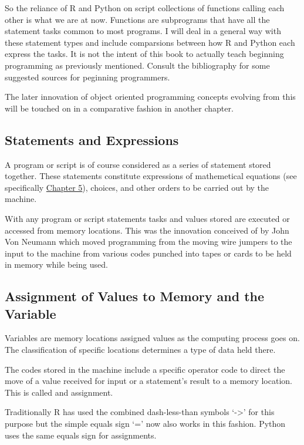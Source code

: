 \documentclass[]{book}
\theoremstyle{definition}
\theoremstyle{definition}
\theoremstyle{definition}
\theoremstyle{remark}
\begin{document}
So the reliance of R and Python on script collections of functions
calling each other is what we are at now. Functions are subprograms that
have all the statement tasks common to most programs. I will deal in a
general way with these statement types and include comparsions between
how R and Python each express the tasks. It is not the intent of this
book to actually teach beginning programming as previously mentioned.
Consult the bibliography for some suggested sources for peginning
programmers.

The later innovation of object oriented programming concepts evolving
from this will be touched on in a comparative fashion in another
chapter.

\subsection{Statements and
Expressions}\label{statements-and-expressions}

A program or script is of course considered as a series of statement
stored together. These statements constitute expressions of mathemetical
equations (see specifically \href{}{Chapter 5}), choices, and other
orders to be carried out by the machine.

With any program or script statements tasks and values stored are
executed or accessed from memory locations. This was the innovation
conceived of by John Von Neumann which moved programming from the moving
wire jumpers to the input to the machine from various codes punched into
tapes or cards to be held in memory while being used.

\subsection{Assignment of Values to Memory and the
Variable}\label{assignment-of-values-to-memory-and-the-variable}

Variables are memory locations assigned values as the computing process
goes on. The classification of specific locations determines a type of
data held there.

The codes stored in the machine include a specific operator code to
direct the move of a value received for input or a statement's result to
a memory location. This is called and assignment.

Traditionally R has used the combined dash-less-than symbols
`-\textgreater{}' for this purpose but the simple equals sign `=' now
also works in this fashion. Python uses the same equals sign for
assignments.
\end{document}
